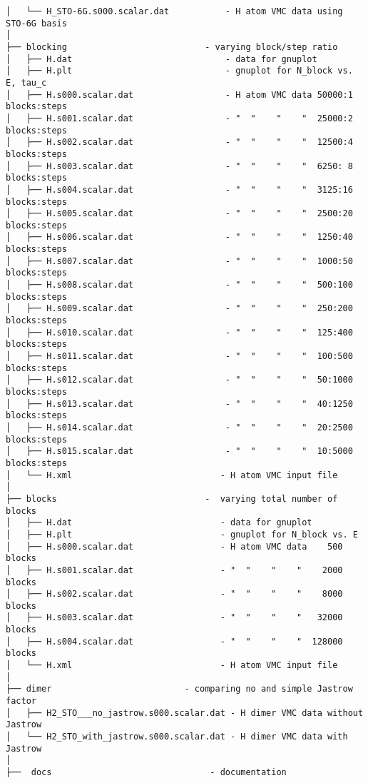 \begin{verbatim}
│   └── H_STO-6G.s000.scalar.dat           - H atom VMC data using STO-6G basis
│
├── blocking                           - varying block/step ratio
│   ├── H.dat                              - data for gnuplot
│   ├── H.plt                              - gnuplot for N_block vs. E, tau_c
│   ├── H.s000.scalar.dat                  - H atom VMC data 50000:1 blocks:steps
│   ├── H.s001.scalar.dat                  - "  "    "    "  25000:2 blocks:steps
│   ├── H.s002.scalar.dat                  - "  "    "    "  12500:4 blocks:steps
│   ├── H.s003.scalar.dat                  - "  "    "    "  6250: 8 blocks:steps
│   ├── H.s004.scalar.dat                  - "  "    "    "  3125:16 blocks:steps
│   ├── H.s005.scalar.dat                  - "  "    "    "  2500:20 blocks:steps
│   ├── H.s006.scalar.dat                  - "  "    "    "  1250:40 blocks:steps
│   ├── H.s007.scalar.dat                  - "  "    "    "  1000:50 blocks:steps
│   ├── H.s008.scalar.dat                  - "  "    "    "  500:100 blocks:steps
│   ├── H.s009.scalar.dat                  - "  "    "    "  250:200 blocks:steps
│   ├── H.s010.scalar.dat                  - "  "    "    "  125:400 blocks:steps
│   ├── H.s011.scalar.dat                  - "  "    "    "  100:500 blocks:steps
│   ├── H.s012.scalar.dat                  - "  "    "    "  50:1000 blocks:steps
│   ├── H.s013.scalar.dat                  - "  "    "    "  40:1250 blocks:steps
│   ├── H.s014.scalar.dat                  - "  "    "    "  20:2500 blocks:steps
│   ├── H.s015.scalar.dat                  - "  "    "    "  10:5000 blocks:steps
│   └── H.xml                             - H atom VMC input file
│
├── blocks                             -  varying total number of blocks
│   ├── H.dat                             - data for gnuplot
│   ├── H.plt                             - gnuplot for N_block vs. E
│   ├── H.s000.scalar.dat                 - H atom VMC data    500 blocks
│   ├── H.s001.scalar.dat                 - "  "    "    "    2000 blocks
│   ├── H.s002.scalar.dat                 - "  "    "    "    8000 blocks
│   ├── H.s003.scalar.dat                 - "  "    "    "   32000 blocks
│   ├── H.s004.scalar.dat                 - "  "    "    "  128000 blocks
│   └── H.xml                             - H atom VMC input file 
│
├── dimer                          - comparing no and simple Jastrow factor
│   ├── H2_STO___no_jastrow.s000.scalar.dat - H dimer VMC data without Jastrow
│   └── H2_STO_with_jastrow.s000.scalar.dat - H dimer VMC data with Jastrow
│
├──  docs                               - documentation

\end{verbatim}
